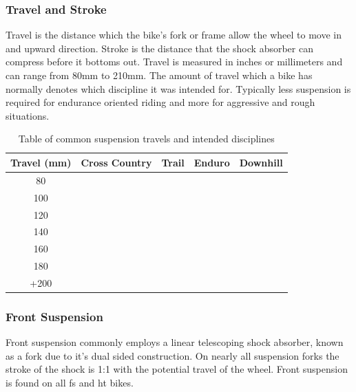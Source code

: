 \documentclass[a4paper, 12pt, hidelinks]{article}
\begin{document}
	\subsubsection{Travel and Stroke} 
		Travel is the distance which the bike's fork or frame allow the wheel to move in and upward direction. Stroke is the distance that the shock absorber can compress before it bottoms out. Travel is measured in inches or millimeters and can range from 80mm to 210mm. The amount of travel which a bike has normally denotes which discipline it was intended for. Typically less suspension is required for endurance oriented riding and more for aggressive and rough situations.
		\begin{table}[h!]
		\centering
		\caption{Table of common suspension travels and intended disciplines}
		\label{tab:table1}
		\begin{tabular}{|c|cccc|}
			\hline
			Travel (mm)&Cross Country&Trail&Enduro&Downhill\\
			\hline
			80&\cellcolor[gray]{0.5}&&&
			\\
			100&\cellcolor[gray]{0.5}&&&
			\\
			120&\cellcolor[gray]{0.5}&\cellcolor[gray]{0.5}&&
			\\
			140&&\cellcolor[gray]{0.5}&\cellcolor[gray]{0.5}&
			\\
			160&&&\cellcolor[gray]{0.5}&
			\\
			180&&&\cellcolor[gray]{0.5}&\cellcolor[gray]{0.5}
			\\
			+200&&&&\cellcolor[gray]{0.5}\\
			\hline
		\end{tabular}
	\end{table}
	\subsubsection{Front Suspension}
		Front suspension commonly employs a linear telescoping shock absorber, known as a fork due to it's dual sided construction. On nearly all suspension forks the stroke of the shock is 1:1 with the potential travel of the wheel. Front suspension is found on all \gls{fs} and \gls{ht} bikes.
\end{document}
